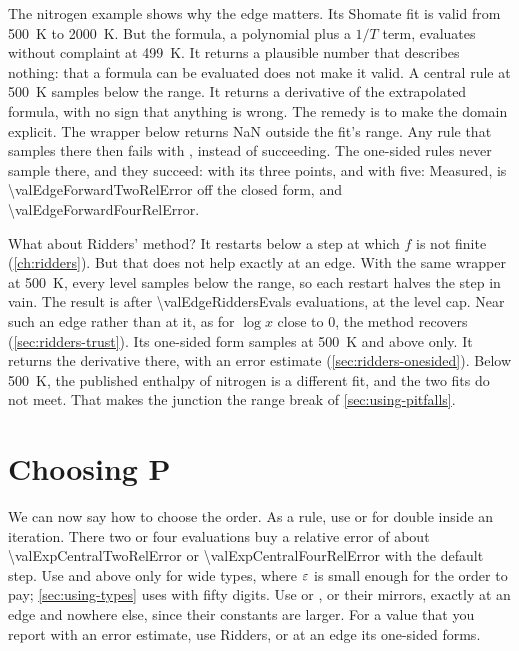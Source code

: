 The nitrogen example shows why the edge matters. Its Shomate fit is valid from \SI{500}{\kelvin} to
\SI{2000}{\kelvin}. But the formula, a polynomial plus a $1/T$ term, evaluates without complaint at
\SI{499}{\kelvin}. It returns a plausible number that describes nothing: that a formula can be evaluated does not
make it valid. A central rule at \SI{500}{\kelvin} samples below the range. It returns a derivative of the
extrapolated formula, with no sign that anything is wrong. The remedy is to make the domain explicit. The wrapper
below returns NaN outside the fit's range. Any rule that samples there then fails with , instead of
succeeding. The one-sided rules never sample there, and they succeed:  with its three points, and
 with five:
%
Measured,  is \num{\valEdgeForwardTwoRelError} off the closed form, and 
\num{\valEdgeForwardFourRelError}.

What about Ridders' method? It restarts below a step at which $f$ is not finite (\cref{ch:ridders}). But that does
not help exactly at an edge. With the same wrapper at \SI{500}{\kelvin}, every level samples below the range, so
each restart halves the step in vain. The result is \valEdgeRiddersStatus{} after \num{\valEdgeRiddersEvals}
evaluations, at the level cap. Near such an edge rather than at it, as for $\log x$ close to 0, the method recovers
(\cref{sec:ridders-trust}). Its one-sided form  samples at \SI{500}{\kelvin} and above only. It
returns the derivative there, with an error estimate (\cref{sec:ridders-onesided}). Below \SI{500}{\kelvin}, the
published enthalpy of nitrogen is a different fit, and the two fits do not meet. That makes the junction the range
break of \cref{sec:using-pitfalls}.

\section{Choosing P}\label{sec:stencils-choosing}

We can now say how to choose the order. As a rule, use  or  for double inside an
iteration. There two or four evaluations buy a relative error of about \num{\valExpCentralTwoRelError} or
\num{\valExpCentralFourRelError} with the default step. Use  and above only for wide types, where
$\varepsilon$ is small enough for the order to pay; \cref{sec:using-types} uses  with fifty digits. Use
 or , or their mirrors, exactly at an edge and nowhere else, since their constants
are larger. For a value that you report with an error estimate, use Ridders, or at an edge its one-sided forms.

